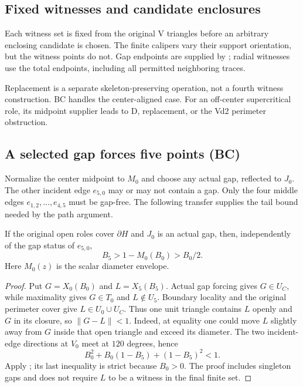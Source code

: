 \subsection{Fixed witnesses and candidate enclosures}
\label{subsec:trace-exact-ab-envelopes}

Each witness set is fixed from the original V triangles before an
arbitrary enclosing candidate is chosen. The finite calipers vary their support orientation, but the witness points do not. Gap endpoints are supplied
by ; radial witnesses use the total endpoints,
including all permitted neighboring traces.







Replacement is a separate skeleton-preserving operation, not a fourth
witness construction. BC handles the center-aligned case. For an off-center
supercritical role, its midpoint supplier leads to D, replacement, or the
Vd2 perimeter obstruction.

\subsection{A selected gap forces five points (BC)}

Normalize the center midpoint to $M_0$ and choose any actual gap, reflected
to $J_0$. The other incident edge $e_{5,0}$ may or may not contain a gap.
Only the four middle edges $e_{1,2},\ldots,e_{4,5}$ must be gap-free.
The following transfer supplies the tail bound needed by the path argument.

\begin{lemma}
\label{lem:shared-gap-anchor-transfer}
If the original open roles cover $\partial H$ and $J_0$ is an actual gap,
then, independently of the gap status of $e_{5,0}$,
\[
 B_5>1-M_0(B_0)>B_0/2.
\]
Here $M_0(z)$ is the scalar diameter envelope.
\end{lemma}
\begin{proof}
Put $G=X_0(B_0)$ and $L=X_5(B_5)$. Actual gap forcing gives
$G\in U_C$, while maximality gives $G\in T_0$ and $L\notin U_5$.
Boundary locality and the original perimeter cover give
$L\in U_0\cup U_C$. Thus one unit triangle contains $L$ openly and
$G$ in its closure, so $\|G-L\|<1$. Indeed, at equality one could move
$L$ slightly away from $G$ inside that open triangle and exceed its diameter.
The two incident-edge directions at $V_0$ meet at $120$ degrees, hence
\[
 B_0^2+B_0(1-B_5)+(1-B_5)^2<1.
\]
Apply ; its last inequality is strict
because $B_0>0$. The proof includes singleton gaps and does not require
$L$ to be a witness in the final finite set.
\end{proof}


